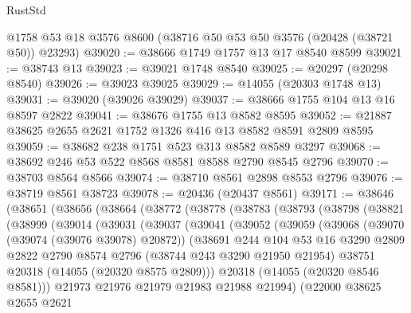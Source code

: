 \begin{lexlean}{RustStd}
\begin{coremodule}
    @1758
    @53
    @18
    @3576
    @8600
    (@38716 @50 @53 @50 @3576 (@20428 (@38721 @50)) @23293)
@39020 := @38666 @1749 @1757 @13 @17 @8540 @8599
@39021 := @38743 @13
@39023 := @39021 @1748 @8540
@39025 := @20297 (@20298 @8540)
@39026 := @39023 @39025
@39029 := @14055 (@20303 @1748 @13)
@39031 := @39020 (@39026 @39029)
@39037 := @38666 @1755 @104 @13 @16 @8597 @2822
@39041 := @38676 @1755 @13 @8582 @8595
@39052 := @21887 @38625 @2655 @2621 @1752 @1326 @416 @13 @8582 @8591 @2809 @8595
@39059 := @38682 @238 @1751 @523 @313 @8582 @8589 @3297
@39068 := @38692 @246 @53 @522 @8568 @8581 @8588 @2790 @8545 @2796
@39070 := @38703 @8564 @8566
@39074 := @38710 @8561 @2898 @8553 @2796
@39076 := @38719 @8561 @38723
@39078 := @20436 (@20437 @8561)
@39171 := @38646
    (@38651
      (@38656
        (@38664
          (@38772
            (@38778
              (@38783
                (@38793
                  (@38798
                    (@38821
                      (@38999
                        (@39014
                          (@39031
                            (@39037
                              (@39041
                                (@39052
                                  (@39059
                                    (@39068
                                      (@39070 (@39074 (@39076 @39078) @20872))
                                      (@38691
                                        @244
                                        @104
                                        @53
                                        @16
                                        @3290
                                        @2809
                                        @2822
                                        @2790
                                        @8574
                                        @2796
                                        (@38744 @243 @3290 @21950 @21954)
                                        @38751
                                        @20318
                                        (@14055 (@20320 @8575 @2809)))
                                      @20318
                                      (@14055 (@20320 @8546 @8581)))
                                    @21973
                                    @21976
                                    @21979
                                    @21983
                                    @21988
                                    @21994)
                                  (@22000
                                    @38625
                                    @2655
                                    @2621

\end{coremodule}
\end{lexlean}
